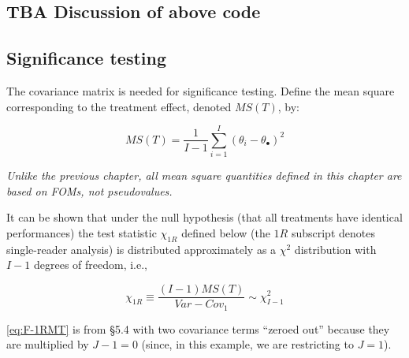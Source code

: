 \documentclass[
]{book}
\newenvironment{Shaded}{\begin{snugshade}}{\end{snugshade}}
\newcommand{\CommentTok}[1]{\textcolor[rgb]{0.56,0.35,0.01}{\textit{#1}}}
\newcommand{\KeywordTok}[1]{\textcolor[rgb]{0.13,0.29,0.53}{\textbf{#1}}}
\newcommand{\NormalTok}[1]{#1}
\newcommand{\OperatorTok}[1]{\textcolor[rgb]{0.81,0.36,0.00}{\textbf{#1}}}
\newcommand{\StringTok}[1]{\textcolor[rgb]{0.31,0.60,0.02}{#1}}
\begin{document}
\begin{Shaded}
\end{Shaded}

\hypertarget{tba-discussion-of-above-code}{%
\subsection{TBA Discussion of above code}\label{tba-discussion-of-above-code}}

\hypertarget{significance-testing}{%
\subsection{Significance testing}\label{significance-testing}}

The covariance matrix is needed for significance testing. Define the mean square corresponding to the treatment effect, denoted \(MS(T)\), by:

\begin{equation}
MS(T)=\frac{1}{I-1}\sum_{i=1}^{I}(\theta_i-\theta_\bullet)^2
\label{eq:DefinitionMST}
\end{equation}

\emph{Unlike the previous chapter, all mean square quantities defined in this chapter are based on FOMs, not pseudovalues.}

It can be shown that under the null hypothesis (that all treatments have identical performances) the test statistic \(\chi_{1R}\) defined below (the \(1R\) subscript denotes single-reader analysis) is distributed approximately as a \(\chi^2\) distribution with \(I-1\) degrees of freedom, i.e.,

\begin{equation}
\chi_{1R} \equiv \frac{(I-1)MS(T)}{Var-Cov_1} \sim \chi_{I-1}^{2}
\label{eq:F-1RMT}
\end{equation}

\eqref{eq:F-1RMT} is from §5.4 \citep{RN1865} with two covariance terms ``zeroed out'' because they are multiplied by \(J-1 = 0\) (since, in this example, we are restricting to \(J=1\)).
\end{document}
